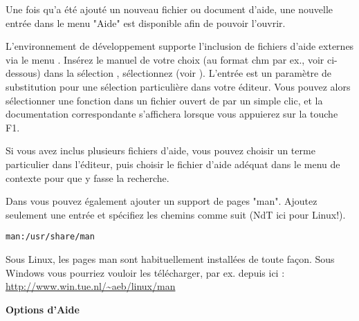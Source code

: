 Une fois qu'a été ajouté un nouveau fichier ou document d'aide, une nouvelle entrée dans le menu "Aide" est disponible afin de pouvoir l'ouvrir.

L'environnement de développement \codeblocks supporte l'inclusion de fichiers d'aide externes via le menu . Insérez le manuel de votre choix (au format chm par ex., voir ci-dessous) dans la sélection , sélectionnez  (voir ). L'entrée  est un paramètre de substitution pour une sélection particulière dans votre éditeur. Vous pouvez alors sélectionner une fonction dans un fichier ouvert de \codeblocks par un simple clic, et la documentation correspondante s'affichera lorsque vous appuierez sur la touche F1.

Si vous avez inclus plusieurs fichiers d'aide, vous pouvez choisir un terme particulier dans l'éditeur, puis choisir le fichier d'aide adéquat dans le menu de contexte  pour que \codeblocks y fasse la recherche.


Dans \codeblocks vous pouvez également ajouter un support de pages "man". Ajoutez seulement une entrée  et spécifiez les chemins comme suit (NdT ici pour Linux!).

\begin{lstlisting}
man:/usr/share/man
\end{lstlisting}

Sous Linux, les pages man sont habituellement installées de toute façon. Sous Windows vous pourriez vouloir les télécharger, par ex. depuis ici : \url{http://www.win.tue.nl/~aeb/linux/man}

\textbf{Options d'Aide}

